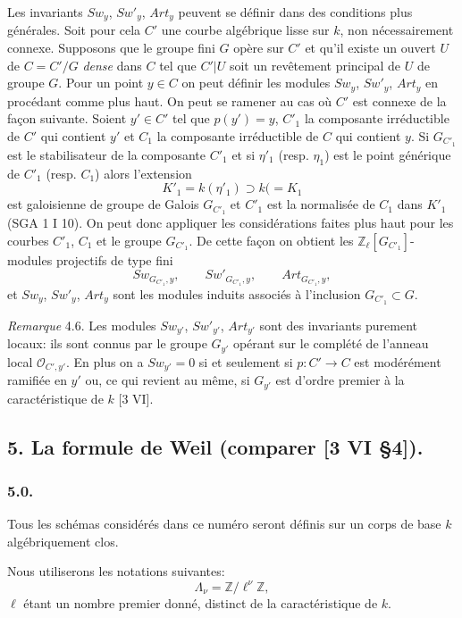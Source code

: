 \documentclass[11pt]{article}
\begin{document}
Les
invariants $Sw_y$, $Sw'_y$, $Art_y$ peuvent se définir dans des conditions plus générales. Soit pour cela $C'$ une courbe algébrique lisse sur $k$, non nécessairement connexe. Supposons que le groupe fini $G$ opère sur $C'$ et qu'il existe un ouvert $U$ de $C=C'/G$ \emph{dense} dans $C$ tel que $C'|U$ soit un revêtement principal de $U$ de groupe $G$. Pour un point $y\in C$ on peut définir les modules $Sw_y$, $Sw'_y$, $Art_y$ en procédant comme plus haut. On peut se ramener au cas où $C'$ est connexe de la façon suivante. Soient $y'\in C'$ tel que $p(y')=y$, $C'_1$ la composante irréductible de $C'$ qui contient $y'$ et $C_1$ la composante irréductible de $C$ qui contient $y$. Si $G_{C'_1}$ est le stabilisateur de la composante $C'_1$ et si $\eta'_1$ (resp. $\eta_1$) est le point générique de $C'_1$ (resp. $C_1$) alors l'extension
\[
K'_1=k(\eta'_1)\supset k(=K_1
\]
est galoisienne de groupe de Galois $G_{C'_1}$ et $C'_1$ est la normalisée de $C_1$ dans $K'_1$ (SGA 1 I 10). On peut donc appliquer les considérations faites plus haut pour les courbes $C'_1$, $C_1$ et le groupe $G_{C'_1}$. De cette façon on obtient les $\mathbb Z_\ell[G_{C'_1}]$-modules projectifs de type fini
\[
Sw_{G_{C'_1},y},\qquad Sw'_{G_{C'_1},y},\qquad Art_{G_{C'_1},y},
\]
et $Sw_y$, $Sw'_y$, $Art_y$ sont les modules induits associés à l'inclusion $G_{C'_1}\subset G$.

\emph{Remarque} 4.6. Les modules $Sw_{y'}$, $Sw'_{y'}$, $Art_{y'}$ sont des invariants purement locaux: ils sont connus par le groupe $G_{y'}$ opérant sur le complété de l'anneau local $\mathcal O_{C',y'}$. En plus on a $Sw_{y'}=0$ si et seulement si $p:C'\to C$ est modérément ramifiée en $y'$ ou, ce qui revient au même, si $G_{y'}$ est d'ordre premier à la caractéristique de $k$ [3 VI].

\subsection*{5. La formule de Weil (comparer [3 VI §4]).}

\subsubsection*{5.0.}

Tous les schémas considérés dans ce numéro seront définis sur un corps de base $k$ algébriquement clos.

Nous utiliserons les notations suivantes:
\[
\Lambda_\nu=\mathbb Z/\ell^\nu\mathbb Z,
\]
$\ell$ étant un nombre premier donné, distinct de la caractéristique de $k$.
\end{document}
